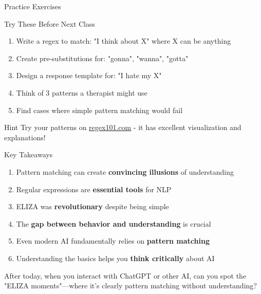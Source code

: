 \documentclass[aspectratio=169]{beamer}
\begin{document}
\begin{frame}{Practice Exercises 💪}
\small
\begin{block}{Try These Before Next Class}
\begin{enumerate}\setlength{\itemsep}{0pt}
    \item Write a regex to match: "I think about X" where X can be anything
    \item Create pre-substitutions for: "gonna", "wanna", "gotta"
    \item Design a response template for: "I hate my X"
    \item Think of 3 patterns a therapist might use
    \item Find cases where simple pattern matching would fail
\end{enumerate}
\end{block}

\vspace{0.3cm}

\begin{alertblock}{Hint}
Try your patterns on \href{https://regex101.com}{regex101.com} - it has excellent visualization and explanations!
\end{alertblock}
\end{frame}

\begin{frame}[shrink=10]{Key Takeaways 🔑}
\small
\begin{enumerate}\setlength{\itemsep}{0pt}
    \item Pattern matching can create \textbf{convincing illusions} of understanding
    \item Regular expressions are \textbf{essential tools} for NLP
    \item ELIZA was \textbf{revolutionary} despite being simple
    \item The \textbf{gap between behavior and understanding} is crucial
    \item Even modern AI fundamentally relies on \textbf{pattern matching}
    \item Understanding the basics helps you \textbf{think critically} about AI
\end{enumerate}

\vspace{0.3cm}

\begin{discussion}
After today, when you interact with ChatGPT or other AI, can you spot the "ELIZA moments"—where it's clearly pattern matching without understanding?
\end{discussion}
\end{frame}
\end{document}
